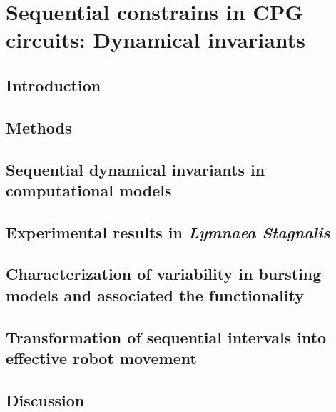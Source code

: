 \chapter{Sequential constrains in CPG circuits: Dynamical invariants}
\label{c-invariants}
\section{Introduction}

\section{Methods}

\section{Sequential dynamical invariants in computational models}
\label{c-invariants-model}

\section{Experimental results in \textit{Lymnaea Stagnalis}}

\section{Characterization of variability in bursting models and associated the functionality}

\section{Transformation of sequential intervals into effective robot movement}

\section{Discussion}
